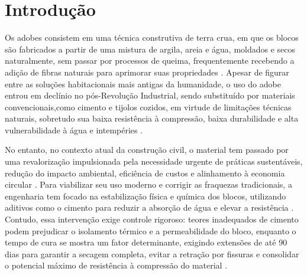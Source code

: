 \chapter{Introdução}



Os adobes consistem em uma técnica construtiva de terra crua, em que os blocos são fabricados a partir de uma mistura de argila, areia e água, moldados e secos naturalmente, sem passar por processos de queima, frequentemente recebendo a adição de fibras naturais para aprimorar suas propriedades \cite{Bailly2024, Junior2020, Dormohamadi2024, Morel2021}. Apesar de figurar entre as soluções habitacionais mais antigas da humanidade, o uso do adobe entrou em declínio no pós-Revolução Industrial, sendo substituído por materiais convencionais,como cimento e tijolos cozidos, em virtude de limitações técnicas naturais, sobretudo sua baixa resistência à compressão, baixa durabilidade e alta vulnerabilidade à água e intempéries \cite{Junior2020, Morel2021, Rocco2024, Sharma2016, VanDerLinden2019}.

No entanto, no contexto atual da construção civil, o material tem passado por uma revalorização impulsionada pela necessidade urgente de práticas sustentáveis, redução do impacto ambiental, eficiência de custos e alinhamento à economia circular \cite{Bailly2024, Morel2021, VanDerLinden2019}. Para viabilizar seu uso moderno e corrigir as fraquezas tradicionais, a engenharia tem focado na estabilização física e química dos blocos, utilizando aditivos como o cimento para reduzir a absorção de água e elevar a resistência \cite{Bailly2024, Dormohamadi2024, Sharma2016, Kariyawasam2016}. Contudo, essa intervenção exige controle rigoroso: teores inadequados de cimento podem prejudicar o isolamento térmico e a permeabilidade do bloco, enquanto o tempo de cura se mostra um fator determinante, exigindo extensões de até 90 dias para garantir a secagem completa, evitar a retração por fissuras e consolidar o potencial máximo de resistência à compressão do material \cite{Bailly2024}.

